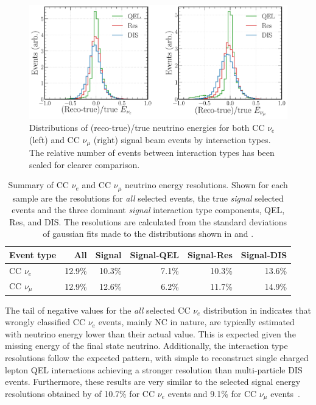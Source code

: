 \begin{figure} %
    \includegraphics[width=\textwidth]{diagrams/7-results/final_energy_frac_split.pdf}
    \caption[Distributions of (reco-true)/true neutrino energies by interaction type]
    {Distributions of (reco-true)/true neutrino energies for both CC $\nu_{e}$ (left) and CC
        $\nu_{\mu}$ (right) signal beam events by interaction types. The relative number of events
        between interaction types has been scaled for clearer comparison.}
    \label{fig:final_energy_frac_split}
\end{figure}

\begin{table}
    \begin{tabular}{lrrrrr}
        Event type     & All    & Signal & Signal-QEL & Signal-Res & Signal-DIS \\
        \midrule
        CC $\nu_{e}$   & 12.9\% & 10.3\% & 7.1\%      & 10.3\%     & 13.6\%     \\
        CC $\nu_{\mu}$ & 12.9\% & 12.6\% & 6.2\%      & 11.7\%     & 14.9\%     \\
    \end{tabular}
    \caption[Summary of CC $\nu_{e}$ and CC $\nu_{\mu}$ neutrino energy resolutions]
    {Summary of CC $\nu_{e}$ and CC $\nu_{\mu}$ neutrino energy resolutions. Shown for each sample
        are the resolutions for \emph{all} selected events, the true \emph{signal} selected events
        and the three dominant \emph{signal} interaction type components, QEL, Res, and DIS. The
        resolutions are calculated from the standard deviations of gaussian fits made to the
        distributions shown in  and
        .}
    \label{tab:energy_resolutions}
\end{table}

The tail of negative values for the \emph{all} selected CC $\nu_{e}$ distribution in
 indicates that wrongly classified CC $\nu_{e}$ events, mainly NC
in nature, are typically estimated with neutrino energy lower than their actual value. This is
expected given the missing energy of the final state neutrino. Additionally, the interaction type
resolutions follow the expected pattern, with simple to reconstruct single charged lepton QEL
interactions achieving a stronger resolution than multi-particle DIS events. Furthermore, these
results are very similar to the selected signal energy resolutions obtained by \nova of 10.7\% for
CC $\nu_{e}$ events and 9.1\% for CC $\nu_{\mu}$ events~\cite{acero2019}.

